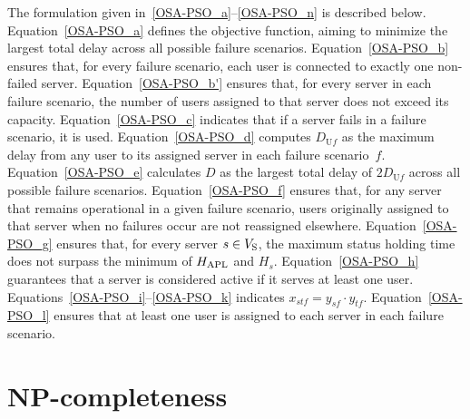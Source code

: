 \documentclass[10pt, letterpaper]{IEEEtran}
\begin{document}
\begin{CJK}{UTF8}{ipxm}
The formulation given in~\eqref{OSA-PSO_a}--\eqref{OSA-PSO_n} is described below.
Equation~\eqref{OSA-PSO_a} defines the objective function, aiming to minimize the largest total delay across all possible failure scenarios.
Equation~\eqref{OSA-PSO_b} ensures that, for every failure scenario, each user is connected to exactly one non-failed server.
Equation~\eqref{OSA-PSO_b'} ensures that, for every server in each failure scenario, the number of users assigned to that server does not exceed its capacity.
Equation~\eqref{OSA-PSO_c} indicates that if a server fails in a failure scenario, it is used.
%
Equation~\eqref{OSA-PSO_d} computes $D_{\mathrm{U}f}$ as the maximum delay from any user to its assigned server in each failure scenario~$f$.
Equation~\eqref{OSA-PSO_e} calculates $D$ as the largest total delay of $2D_{\mathrm{U}f}$ across all possible failure scenarios.
Equation~\eqref{OSA-PSO_f} ensures that, for any server that remains operational in a given failure scenario, users originally assigned to that server when no failures occur are not reassigned elsewhere.
Equation~\eqref{OSA-PSO_g} ensures that, for every server $s \in V_{\rm{S}}$, the maximum status holding time does not surpass the minimum of $H_{\rm APL}$ and $H_s$.
Equation~\eqref{OSA-PSO_h} guarantees that a server is considered active if it serves at least one user.
Equations~\eqref{OSA-PSO_i}--\eqref{OSA-PSO_k} indicates $x_{stf} = y_{sf} \cdot y_{tf}$.
Equation~\eqref{OSA-PSO_l} ensures that at least one user is assigned to each server in each failure scenario.


\section{NP-completeness}
\label{sec:NP-Completeness}


\end{CJK}
\end{document}
